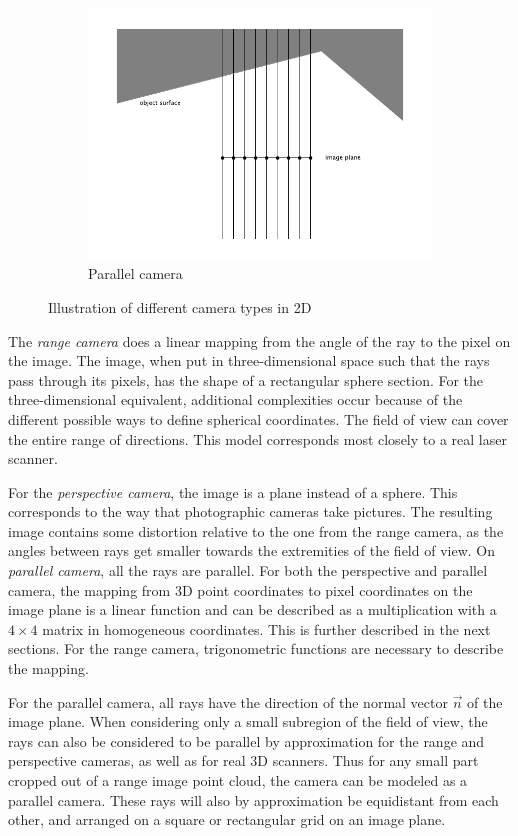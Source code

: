 \begin{figure}[H]
\begin{subfigure}{.33\textwidth}
	\includegraphics[trim=8mm 1cm 8mm 1cm, crop, width=\linewidth]{fig/cam_parallel.pdf}
	\caption{Parallel camera}
\end{subfigure}
\caption{Illustration of different camera types in 2D}
\end{figure}

The \emph{range camera} does a linear mapping from the angle of the ray to the pixel on the image. The image, when put in three-dimensional space such that the rays pass through its pixels, has the shape of a rectangular sphere section. For the three-dimensional equivalent, additional complexities occur because of the different possible ways to define spherical coordinates. The field of view can cover the entire range of directions. This model corresponds most closely to a real laser scanner.

For the \emph{perspective camera}, the image is a plane instead of a sphere. This corresponds to the way that photographic cameras take pictures. The resulting image contains some distortion relative to the one from the range camera, as the angles between rays get smaller towards the extremities of the field of view. On \emph{parallel camera}, all the rays are parallel. For both the perspective and parallel camera, the mapping from 3D point coordinates to pixel coordinates on the image plane is a linear function and can be described as a multiplication with a $4 \times 4$ matrix in homogeneous coordinates. This is further described in the next sections. For the range camera, trigonometric functions are necessary to describe the mapping.

For the parallel camera, all rays have the direction of the normal vector $\vec{n}$ of the image plane. When considering only a small subregion of the field of view, the rays can also be considered to be parallel by approximation for the range and perspective cameras, as well as for real 3D scanners. Thus for any small part cropped out of a range image point cloud, the camera can be modeled as a parallel camera. These rays will also by approximation be equidistant from each other, and arranged on a square or rectangular grid on an image plane.

